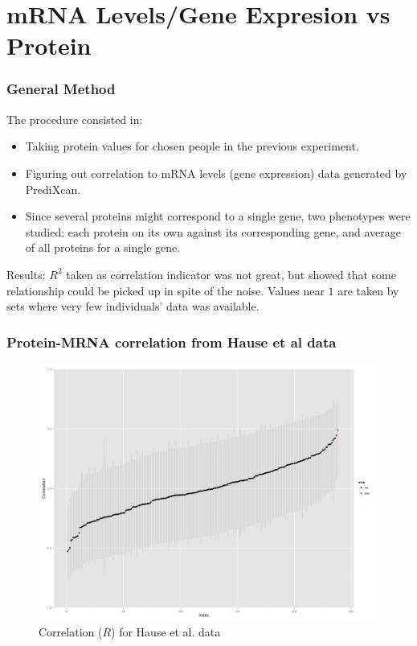 \documentclass{beamer}
\begin{document}
  \section{mRNA Levels/Gene Expresion vs Protein}
    \begin{frame}
    \frametitle{General Method}
    The procedure consisted in:
    \begin{itemize}
      \item
      Taking protein values for chosen people in the previous experiment.
      \item
      Figuring out correlation to mRNA levels (gene expression) data generated by PrediXcan.
      \item
      Since several proteins might correspond to a single gene, 
      two phenotypes were studied: each protein on its own against its corresponding gene, 
      and average of all proteins for a single gene.
    \end{itemize}
    \vskip15pt
    Results:
    $R^2$ taken as correlation indicator was not great, but showed that some relationship could be picked up in spite of the noise.
    Values near $1$ are taken by sets where very few individuals' data was available.
  \end{frame}
  
  \begin{frame}
    \frametitle{Protein-MRNA correlation from Hause et al data}
    \begin{center}
      \begin{figure}
      \includegraphics[scale=0.2]{../Out/hause_mrna_protein.png}
      \caption{Correlation ($R$) for Hause et al. data}
      \end{figure}
    \end{center}
  \end{frame}
\end{document}
